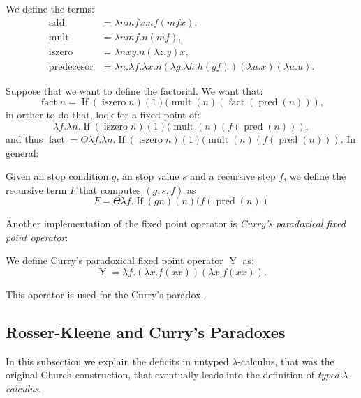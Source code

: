 \begin{definition}
  We define the terms:
  \begin{align*}
    \operatorname{add} &= \lambda nm f x.nf (mf x),\\
    \operatorname{mult} &= \lambda nm f.n(mf),\\
    \operatorname{iszero} &= \lambda nxy.n(\lambda z.y)x,\\
    \operatorname{predecesor} &=\lambda n.\lambda f.\lambda x. n (\lambda g.\lambda h. h (g f)) (\lambda u.x) (\lambda u.u). 
  \end{align*}
                                
\end{definition}
Suppose that we want to define the factorial. We want that:
$$\operatorname{fact} n = \operatorname{If}(\operatorname{iszero} n)(1)(\operatorname{mult}(n)(\operatorname{fact} (\operatorname{pred}(n))),$$
in orther to do that, look for a fixed point of:
$$\lambda f. \lambda n.\operatorname{If}(\operatorname{iszero}n)(1)(\operatorname{mult}(n)(f (\operatorname{pred}(n))),$$
and thus $\operatorname{fact}=\Theta \lambda f.\lambda n. \operatorname{If}(\operatorname{iszero}n)(1)(\operatorname{mult}(n)(f (\operatorname{pred}(n)))$. In general:

\begin{definition}
  Given an stop condition $g$, an stop value $s$ and a recursive step $f$, we define the recursive term $F$ that computes $(g,s,f)$ as
  $$F = \Theta \lambda f. \operatorname{If}(gn)(n)(f (\operatorname{pred}(n))$$
\end{definition}

Another implementation of the fixed point operator is \emph{Curry's paradoxical fixed point operator}:

\begin{definition}
  We define Curry's paradoxical fixed point operator $\operatorname{Y}$ as:
  $$\operatorname{Y}=\lambda f.(\lambda x.f(x x)) (\lambda x.f(x x)).$$
\end{definition}

This operator is used for the Curry's paradox.\\

\subsection{Rosser-Kleene and Curry's Paradoxes}

In this subsection we explain the deficits in untyped $\lambda$-calculus, that was the original Church construction, that eventually leads into the definition of \emph{typed} $\lambda$-\emph{calculus}.\\


